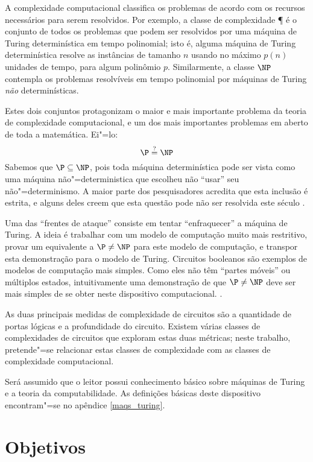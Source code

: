 A complexidade computacional classifica os problemas
de acordo com os recursos necessários para serem resolvidos.
Por exemplo,
a classe de complexidade \P
é o conjunto de todos os problemas que podem ser resolvidos
por uma máquina de Turing determinística
em tempo polinomial;
isto é,
alguma máquina de Turing determinística
resolve as instâncias de tamanho $n$
usando no máximo $p(n)$ unidades de tempo,
para algum polinômio $p$.
Similarmente,
a classe $\NP$
contempla os problemas resolvíveis em tempo polinomial
por máquinas de Turing \emph{não} determinísticas.

Estes dois conjuntos protagonizam
o maior e mais importante problema da teoria de complexidade computacional,
e um dos mais importantes problemas em aberto de toda a matemática.
Ei"=lo:
\begin{displaymath}
    \P \stackrel?= \NP
\end{displaymath}
\cite[p.~270]{Sipser2006}
Sabemos que $\P \subseteq \NP$,
pois toda máquina determinística pode ser vista como
uma máquina não"=deterministica que escolheu não ``usar''
seu não"=determinismo.
A maior parte dos pesquisadores acredita que
esta inclusão é estrita,
e alguns deles creem que esta questão
pode não ser resolvida este século
\cite[p.~2]{Gasarch2012}.

Uma das ``frentes de ataque''
consiste em tentar ``enfraquecer''
a máquina de Turing.
A ideia é trabalhar com um modelo de computação muito mais restritivo,
provar um equivalente a $\P \neq \NP$
para este modelo de computação,
e transpor esta demonstração para o modelo de Turing.
Circuitos booleanos
são exemplos de modelos de computação mais simples.
Como eles não têm ``partes móveis''
ou múltiplos estados,
intuitivamente uma demonstração de que $\P \neq \NP$
deve ser mais simples de se obter
neste dispositivo computacional. \cite{Hastad1987}.

As duas principais medidas
de complexidade de circuitos
são a quantidade de portas lógicas
e a profundidade do circuito.
Existem várias classes de complexidades de circuitos
que exploram estas duas métricas;
neste trabalho,
pretende"=se relacionar estas classes de complexidade
com as classes de complexidade computacional.

Será assumido que o leitor possui conhecimento básico
sobre máquinas de Turing e a teoria da computabilidade.
As definições básicas deste dispositivo
encontram"=se no apêndice \ref{maqs_turing}.

\section{Objetivos}

